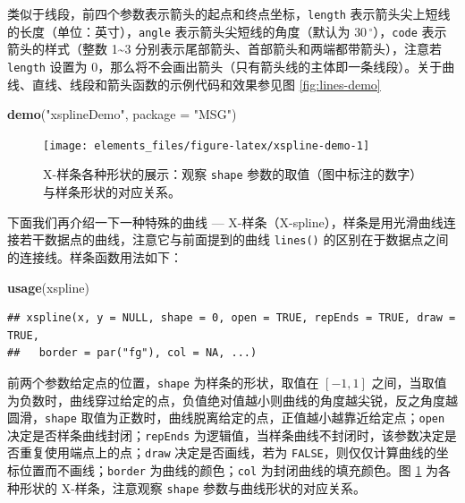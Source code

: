 \documentclass[
  b5paper,
  UTF8,twoside]{book}
\newenvironment{Shaded}{\begin{snugshade}}{\end{snugshade}}
\newcommand{\AttributeTok}[1]{\textcolor[rgb]{0.13,0.29,0.53}{#1}}
\newcommand{\FunctionTok}[1]{\textcolor[rgb]{0.13,0.29,0.53}{\textbf{#1}}}
\newcommand{\NormalTok}[1]{#1}
\newcommand{\StringTok}[1]{\textcolor[rgb]{0.31,0.60,0.02}{#1}}
\begin{document}
类似于线段，前四个参数表示箭头的起点和终点坐标，\texttt{length} 表示箭头尖上短线的长度（单位：英寸），\texttt{angle} 表示箭头尖短线的角度（默认为 \(30\,^{\circ}\)），\texttt{code} 表示箭头的样式（整数 1\textasciitilde3 分别表示尾部箭头、首部箭头和两端都带箭头），注意若 \texttt{length} 设置为 0，那么将不会画出箭头（只有箭头线的主体即一条线段）。关于曲线、直线、线段和箭头函数的示例代码和效果参见图 \ref{fig:lines-demo}

\begin{Shaded}
\begin{Highlighting}[]
\FunctionTok{demo}\NormalTok{(}\StringTok{"xsplineDemo"}\NormalTok{, }\AttributeTok{package =} \StringTok{"MSG"}\NormalTok{)}
\end{Highlighting}
\end{Shaded}

\begin{figure}

{\centering \texttt{[image: elements\_files/figure-latex/xspline-demo-1]} 

}

\caption[X-样条各种形状的展示]{X-样条各种形状的展示：观察 \texttt{shape} 参数的取值（图中标注的数字）与样条形状的对应关系。}\label{fig:xspline-demo}
\end{figure}





下面我们再介绍一下一种特殊的曲线 --- X-样条（X-spline），样条是用光滑曲线连接若干数据点的曲线，注意它与前面提到的曲线 \texttt{lines()} 的区别在于数据点之间的连接线。样条函数用法如下：

\begin{Shaded}
\begin{Highlighting}[]
\FunctionTok{usage}\NormalTok{(xspline)}
\end{Highlighting}
\end{Shaded}

\begin{verbatim}
## xspline(x, y = NULL, shape = 0, open = TRUE, repEnds = TRUE, draw = TRUE,
##   border = par("fg"), col = NA, ...)
\end{verbatim}

前两个参数给定点的位置，\texttt{shape} 为样条的形状，取值在 \([-1, 1]\) 之间，当取值为负数时，曲线穿过给定的点，负值绝对值越小则曲线的角度越尖锐，反之角度越圆滑，\texttt{shape} 取值为正数时，曲线脱离给定的点，正值越小越靠近给定点；\texttt{open} 决定是否样条曲线封闭；\texttt{repEnds} 为逻辑值，当样条曲线不封闭时，该参数决定是否重复使用端点上的点；\texttt{draw} 决定是否画线，若为 \texttt{FALSE}，则仅仅计算曲线的坐标位置而不画线；\texttt{border} 为曲线的颜色；\texttt{col} 为封闭曲线的填充颜色。图 \ref{fig:xspline-demo} 为各种形状的 X-样条，注意观察 \texttt{shape} 参数与曲线形状的对应关系。
\end{document}
